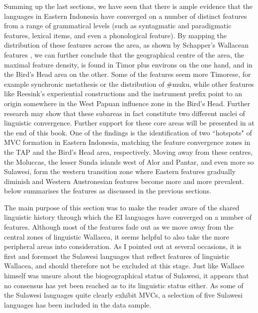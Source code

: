 Summing up the last sections, we have seen that there is ample evidence that the languages in Eastern Indonesia have converged on a number of distinct features from a range of grammatical levels (such as syntagmatic and paradigmatic features, lexical items, and even a phonological feature). By mapping the distribution of these features across the area, as shown by Schapper's Wallacean features \citep[138f.]{schapper2015wallacea}, we can further conclude that the geographical centre of the area, the maximal feature density, is found in Timor plus environs on the one hand, and in the Bird's Head area on the other. Some of the features seem more Timorese, for example synchronic metathesis or the distribution of \#muku, while other features like Reesink's experiential constructions and the instrument prefix point to an origin somewhere in the West Papuan influence zone in the Bird's Head. Further research may show that these subareas in fact constitute two different nuclei of linguistic convergence. Further support for these core areas will be presented in  at the end of this book. One of the findings is the identification of two ``hotspots" of MVC formation in Eastern Indonesia, matching the feature convergence zones in the TAP and the Bird's Head area, respectively. Moving away from these centres, the Moluccas, the lesser Sunda islands west of Alor and Pantar, and even more so Sulawesi, form the western transition zone where Eastern  features gradually diminish and Western Austronesian features become more and more prevalent.  below summarises the features as discussed in the previous sections.

The main purpose of this section was to make the reader aware of the shared linguistic history through which the EI languages have converged on a number of features. Although most of the features fade out as we move away from the central zones of linguistic Wallacea, it seems helpful to also take the more peripheral areas into consideration. As I pointed out at several occasions, it is first and foremost the Sulawesi languages that reflect features of linguistic Wallacea, and should therefore not be excluded at this stage. Just like Wallace himself was unsure about the biogeographical status of Sulawesi, it appears that no consensus has yet been reached as to its linguistic status either. As some of the Sulawesi languages quite clearly exhibit MVCs, a selection of five Sulawesi languages has been included in the data sample. 

